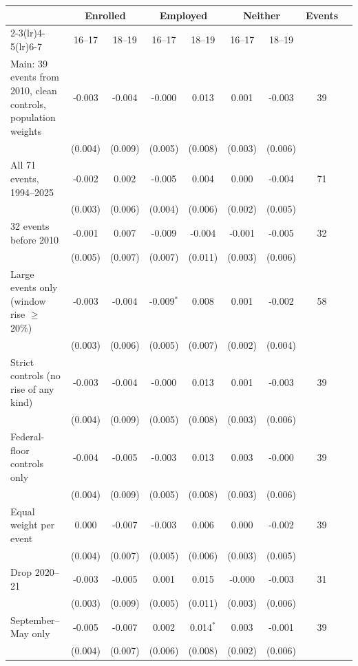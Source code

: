 \begin{tabular}{lcccccccc}
\toprule
 & \multicolumn{2}{c}{Enrolled} & \multicolumn{2}{c}{Employed} & \multicolumn{2}{c}{Neither} & Events \\
\cmidrule(lr){2-3}\cmidrule(lr){4-5}\cmidrule(lr){6-7}
 & 16--17 & 18--19 & 16--17 & 18--19 & 16--17 & 18--19 & \\
\midrule
Main: 39 events from 2010, clean controls, population weights & -0.003 & -0.004 & -0.000 & 0.013 & 0.001 & -0.003 & 39 \\
 & (0.004) & (0.009) & (0.005) & (0.008) & (0.003) & (0.006) &  \\
All 71 events, 1994--2025 & -0.002 & 0.002 & -0.005 & 0.004 & 0.000 & -0.004 & 71 \\
 & (0.003) & (0.006) & (0.004) & (0.006) & (0.002) & (0.005) &  \\
32 events before 2010 & -0.001 & 0.007 & -0.009 & -0.004 & -0.001 & -0.005 & 32 \\
 & (0.005) & (0.007) & (0.007) & (0.011) & (0.003) & (0.006) &  \\
Large events only (window rise $\geq$ 20\%) & -0.003 & -0.004 & -0.009$^{*}$ & 0.008 & 0.001 & -0.002 & 58 \\
 & (0.003) & (0.006) & (0.005) & (0.007) & (0.002) & (0.004) &  \\
Strict controls (no rise of any kind) & -0.003 & -0.004 & -0.000 & 0.013 & 0.001 & -0.003 & 39 \\
 & (0.004) & (0.009) & (0.005) & (0.008) & (0.003) & (0.006) &  \\
Federal-floor controls only & -0.004 & -0.005 & -0.003 & 0.013 & 0.003 & -0.000 & 39 \\
 & (0.004) & (0.009) & (0.005) & (0.008) & (0.003) & (0.006) &  \\
Equal weight per event & 0.000 & -0.007 & -0.003 & 0.006 & 0.000 & -0.002 & 39 \\
 & (0.004) & (0.007) & (0.005) & (0.006) & (0.003) & (0.005) &  \\
Drop 2020--21 & -0.003 & -0.005 & 0.001 & 0.015 & -0.000 & -0.003 & 31 \\
 & (0.003) & (0.009) & (0.005) & (0.011) & (0.003) & (0.006) &  \\
September--May only & -0.005 & -0.007 & 0.002 & 0.014$^{*}$ & 0.003 & -0.001 & 39 \\
 & (0.004) & (0.007) & (0.006) & (0.008) & (0.002) & (0.006) &  \\
\bottomrule
\end{tabular}
